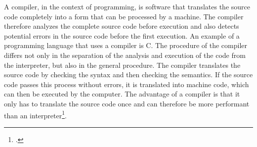 A compiler, in the context of programming, is software that translates the source code completely into a form that can be processed by a machine. The compiler therefore analyzes the complete source code before execution and also detects potential errors in the source code before the first execution. An example of a programming language that uses a compiler is C.
The procedure of the compiler differs not only in the separation of the analysis and execution of the code from the interpreter, but also in the general procedure.
The compiler translates the source code by checking the syntax and then checking the semantics. If the source code passes this process without errors, it is translated into machine code, which can then be executed by the computer.
The advantage of a compiler is that it only has to translate the source code once and can therefore be more performant than an interpreter\footcite{xovi_was_2019}.
